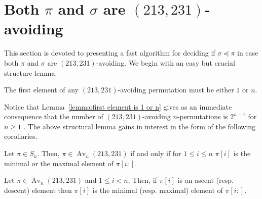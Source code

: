 \documentclass[a4paper]{llncs}
\DeclareMathOperator{\AV}{Av}
\DeclareMathOperator{\Avd}{Av}
\newcommand\Av[2]{\Avd_{{#1}}({#2})}
\DeclareMathOperator{\stripea}{s}
\newcommand{\stripe}[2]{\stripea_{{#1}}[{#2}]}
\newcounter{num}
\newcommand{\dstep}{d}
\newcommand{\ustep}{a}
\begin{document}


\section{Both $\pi$ and $\sigma$ are $(213,231)$-avoiding}
\label{section:both are (213,231)-avoiding}

This section is devoted to presenting a fast algorithm for deciding if
$\sigma \preceq \pi$
in case both $\pi$ and $\sigma$ are $(213,231)$-avoiding.
We begin with an easy but crucial structure lemma.

\begin{lemma}[Folklore]
\label{lemma:first element is 1 or n}
The first element of any $(213,231)$-avoiding permutation
must be either $1$ or $n$.
\end{lemma}

Notice that Lemma~\ref{lemma:first element is 1 or n} gives as an
immediate consequence that the number of $(213,231)$-avoiding $n$-permutations
is $2^{n-1}$ for $n\geq 1$ \cite{Simion:Schmidt:EJC:1985}.
The above structural lemma gains in interest in the form of the following corollaries.

\begin{corollary}
\label{corollary:minmaxelement}
Let $\pi \in S_n$. 
Then,
$\pi \in \AV_n(213,231)$ if and only if for $1 \leq i \leq n$
$\pi[i]$ is the minimal or the maximal element of $\pi[i:]$.
\end{corollary}

\begin{corollary}
\label{corollary:max is ascent}
Let $\pi \in \AV_n(213,231)$ and $1 \leq i < n$. Then,
if $\pi[i]$ is an ascent (resp. descent) element 
then $\pi[i]$ is the minimal (resp. maximal) element 
of $\pi[i:]$.
\end{corollary}

%
\end{document}
